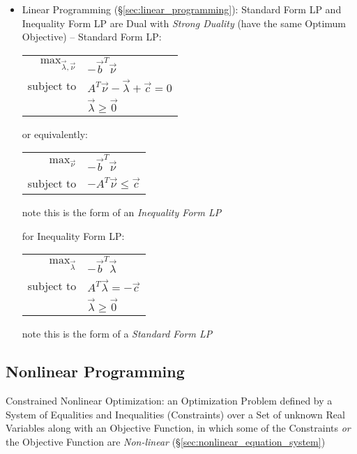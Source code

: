 \begin{itemize}
  \item Linear Programming (\S\ref{sec:linear_programming}): Standard Form LP
    and Inequality Form LP are Dual with \emph{Strong Duality} (have the same
    Optimum Objective) -- Standard Form LP:

    \begin{tabular}{r l}
      $\mathrm{max}_{\vec{\lambda},\vec{\nu}}$ &
        $-\vec{b}^T\vec{\nu}$ \\
      subject to & $A^T\vec{\nu} - \vec{\lambda} + \vec{c} = 0$ \\
                 & $\vec{\lambda} \geq \vec{0}$ \\
    \end{tabular}

    or equivalently:

    \begin{tabular}{r l}
      $\mathrm{max}_{\vec{\nu}}$ &
        $-\vec{b}^T\vec{\nu}$ \\
      subject to & $-A^T\vec{\nu} \leq \vec{c}$ \\
    \end{tabular}

    note this is the form of an \emph{Inequality Form LP}

    for Inequality Form LP:

    \begin{tabular}{r l}
      $\mathrm{max}_{\vec{\lambda}}$ & $-\vec{b}^T\vec{\lambda}$ \\
      subject to & $A^T\vec{\lambda} = -\vec{c}$ \\
                & $\vec{\lambda} \geq \vec{0}$  \\
    \end{tabular}

    note this is the form of a \emph{Standard Form LP}

\end{itemize}



\subsection{Nonlinear Programming}\label{sec:nonlinear_programming}

Constrained Nonlinear Optimization: an Optimization Problem defined by a System
of Equalities and Inequalities (Constraints) over a Set of unknown Real
Variables along with an Objective Function, in which some of the Constraints
\emph{or} the Objective Function are \emph{Non-linear}
(\S\ref{sec:nonlinear_equation_system})


